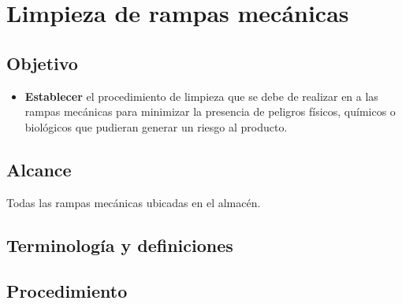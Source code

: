 \thispagestyle{formato-PI}
\renewcommand{\MayorVer}{2}
\renewcommand{\MenorVer}{0}
\renewcommand{\Codigo}{HYS-4-IT}
\renewcommand{\FechaPub}{2023--01}
\renewcommand{\Titulo}{Limpieza de rampas mecánicas}

\section{\Titulo}


\subsection{Objetivo}

\begin{itemize}
	\item \textbf{Establecer} el procedimiento de limpieza que se debe de realizar en a las rampas mecánicas para minimizar la presencia de peligros físicos, químicos o biológicos que pudieran generar un riesgo al producto.
\end{itemize}

\subsection{Alcance}
Todas las rampas mecánicas ubicadas en el almacén.

\subsection{Terminología y definiciones}

\begin{description}
\end{description}



\subsection{Procedimiento}
